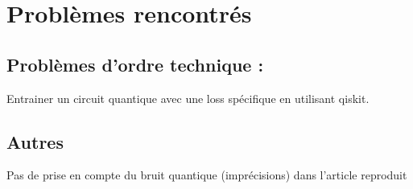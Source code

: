 \documentclass[11pt,a4paper]{article}
\begin{document}
\section{Problèmes rencontrés}

\subsection*{Problèmes d'ordre technique : }
Entrainer un circuit quantique avec une loss spécifique en utilisant qiskit.

\subsection*{Autres}
Pas de prise en compte du bruit quantique (imprécisions) dans l'article reproduit



\end{document}
